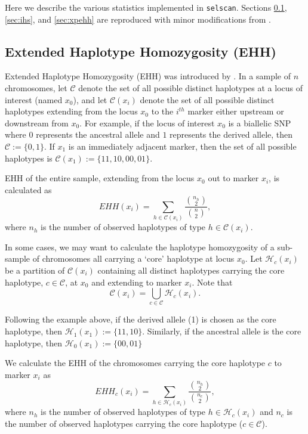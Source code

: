 \documentclass[12pt]{article}%
\begin{document}
Here we describe the various statistics implemented in {\tt selscan}.  Sections 
\ref{sec:ehh}, \ref{sec:ihs}, and \ref{sec:xpehh} are reproduced with minor modifications from 
\cite{SzpiechAndHernandez14}.

\subsection{Extended Haplotype Homozygosity (EHH)}\label{sec:ehh}

Extended Haplotype Homozygosity (EHH) was introduced by \cite{SabetiEtAl02}. In a sample of $n$ chromosomes, let $\mathcal{C}$ denote the set of all possible
distinct haplotypes at a locus of interest (named $x_0$), and let 
$\mathcal{C}(x_i)$ denote the set of all possible distinct haplotypes 
extending from the locus $x_0$ to the $i^{th}$ marker either upstream or 
downstream from $x_0$.  For example, if the locus of interest $x_0$ is a 
biallelic SNP where $0$ represents the ancestral allele and $1$ represents the 
derived allele, then $\mathcal{C} := \{0,1\}$.  If $x_1$ is an immediately 
adjacent marker, then the set of all possible haplotypes is 
$\mathcal{C}(x_1) := \{11,10,00,01\}$.

EHH of the entire sample, extending from the locus $x_0$ 
out to marker $x_i$, is calculated as 
\begin{equation}\label{eq:ehh}
EHH(x_i) = \sum_{h \in \mathcal{C}(x_i)} \frac{{n_h \choose 2}}{{n \choose 2}},
\end{equation}
where $n_h$ is the number of observed haplotypes of type $h \in \mathcal{C}(x_i)$.

In some cases, we may want to calculate the haplotype homozygosity of a 
sub-sample of chromosomes all carrying a `core' haplotype at locus $x_0$. Let 
$\mathcal{H}_c(x_i)$ be a partition of $\mathcal{C}(x_i)$ containing all 
distinct haplotypes carrying the core haplotype, $c \in \mathcal{C}$, at $x_0$ and 
extending to marker $x_i$.  Note that
\begin{equation} 
\mathcal{C}(x_i) = \bigcup_{c \in \mathcal{C}}\mathcal{H}_c(x_i).
\end{equation}

Following the example above, if the derived allele (1) is chosen as the core haplotype,
then $\mathcal{H}_1(x_1) := \{11,10\}$.  Similarly, if the ancestral allele is the core
haplotype, then $\mathcal{H}_0(x_1) := \{00,01\}$

We calculate the EHH of the chromosomes carrying the core haplotype $c$ to marker $x_i$ as
\begin{equation}\label{eq:ehh-core}
EHH_c(x_i) = \sum_{h \in \mathcal{H}_c(x_i)} \frac{{n_h \choose 2}}{{n_c \choose 2}},
\end{equation}
where $n_h$ is the number of observed haplotypes of type $h \in \mathcal{H}_c(x_i)$ and 
$n_c$ is the number of observed haplotypes carrying the core haplotype ($c \in \mathcal{C}$). 
\end{document}
